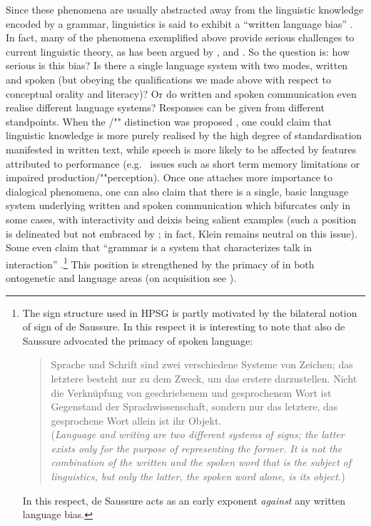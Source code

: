 \documentclass[output=paper
 	        ,biblatex
                ,babelshorthands
                ,newtxmath
                ,draftmode
                ,colorlinks, citecolor=brown
]{langscibook}
\begin{document}
Since these phenomena are usually abstracted away from the linguistic knowledge encoded by a grammar, linguistics is said to exhibit a \enquote{written language bias}  \citep{Linell:2005}.
%
In fact, many of the phenomena exemplified above provide serious challenges  to current  linguistic theory, as has been argued by \citet{Ginzburg:2012}, \citet{Ginzburg:Poesio:2016} and \citet{Kempson:Cann:Gregoromichelaki:Chatzikyriakidis:2016}.
%
So the question is: how serious is this bias? 
%
Is there a single language system with two modes, written and spoken (but obeying the qualifications we made above with respect to conceptual orality and literacy)?
%
Or do written and spoken communication even realise different language systems?
%
Responses can be given from different standpoints. 
%
When the /""  distinction was proposed \citep{Chomsky:1969}, one could claim that linguistic knowledge is more purely realised by the high degree of standardisation manifested in written text, while speech is more likely to be affected by features attributed to performance (e.g.\   issues such as short term memory limitations or impaired production/""perception).
%
Once one attaches more importance to dialogical phenomena, one can also claim that there is a single, basic language system underlying written and spoken communication which bifurcates only in some cases, with interactivity and deixis being salient examples (such a position is delineated but not embraced by \citealt{Klein:1985}; in fact, Klein remains neutral on this issue). 
%
Some even claim that \enquote{grammar is a system that characterizes talk in interaction} \citep[]{Ginzburg:Poesio:2016}.\footnote{The sign structure used in HPSG is partly motivated by the bilateral notion of sign of de Saussure. In this respect it is interesting to note that also de Saussure advocated the primacy of spoken language:
\begin{quote}
    Sprache und Schrift sind zwei verschiedene Systeme von Zeichen; das letztere besteht nur zu dem Zweck, um das erstere darzustellen. Nicht die Verknüpfung von geschriebenem und gesprochenem Wort ist Gegenstand der Sprachwissenschaft, sondern nur das letztere, das gesprochene Wort allein ist ihr Objekt. \citep[]{de:Saussure:2001:DE} \\
    (\textit{Language and writing are two different systems of signs; the latter exists only for the purpose of representing the former. It is not the combination of the written and the spoken word that is the subject of linguistics, but only the latter, the spoken word alone, is its object.})
\end{quote}
In this respect, de Saussure acts as an early exponent \emph{against} any written language bias.
}
%
This position is strengthened by the primacy of  in both ontogenetic and language  areas (on acquisition see ).
\end{document}
